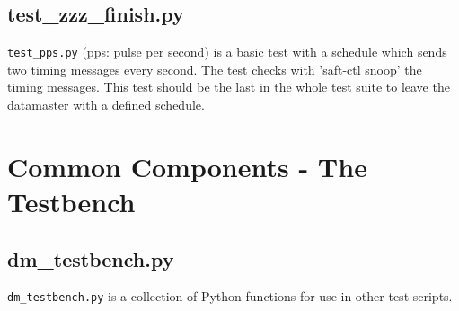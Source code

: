 \documentclass[12pt,a4paper]{report}
\begin{document}
\section{test\_zzz\_finish.py}
\texttt{test\_pps.py} (pps: pulse per second) is a basic test with a
schedule which sends two timing messages every second. The test checks
with 'saft-ctl snoop' the timing messages. This test should be the last
in the whole test suite to leave the datamaster with a defined schedule.

\chapter{Common Components - The Testbench}
\section{dm\_testbench.py}
\texttt{dm\_testbench.py} is a collection of Python functions for use
in other test scripts.
\end{document}
